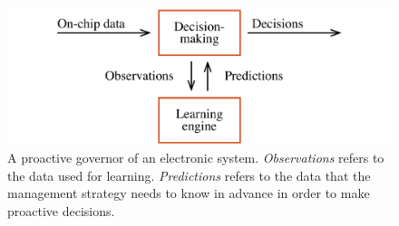 \begin{figure}
  \centering
  \includegraphics[width=1.0\columnwidth]{include/assets/figures/governor.pdf}

  \caption{A proactive governor of an electronic system. \emph{Observations}
  refers to the data used for learning. \emph{Predictions} refers to the data
  that the management strategy needs to know in advance in order to make
  proactive decisions.}

\end{figure}
